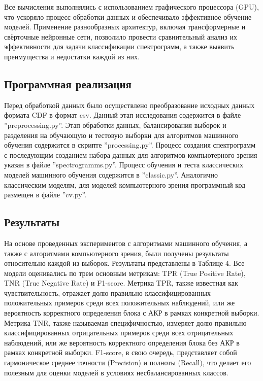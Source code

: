 \documentclass[spec, och, diploma]{SCWorks}
\begin{document}
        Все вычисления выполнялись с использованием графического процессора
        (GPU), что ускоряло процесс обработки данных и обеспечивало эффективное
        обучение моделей. Применение разнообразных архитектур, включая
        трансформерные и свёрточные нейронные сети, позволило провести
        сравнительный анализ их эффективности для задачи классификации
        спектрограмм, а также выявить преимущества и недостатки каждой из них.

    \subsection{Программная реализация}

        Перед обработкой данных было осуществлено преобразование исходных данных
        формата CDF в формат csv. Данный этап исследования содержится в файле
        ''preprocessing.py''. Этап обработки данных, балансирования выборок и
        разделения на обучающую и тестовую выборки для алгоритмов машинного
        обучения содержится в скрипте ''processing.py''. Процесс создания
        спектрограмм с последующим созданием набора данных для алгоритмов
        компьютерного зрения указан в файле ''spectrogramms.py''. Процесс
        обучения и теста классических моделей машинного обучения содержится в
        ''classic.py''. Аналогично классическим моделям, для моделей
        компьютерного зрения программный код размещен в файле ''cv.py''.

    \subsection{Результаты}

        На основе проведенных экспериментов с алгоритмами машинного обучения, а
        также с алгоритмами компьютерного зрения, были получены результаты
        относительно каждой из выборок. Результаты представлены в Таблице 4. Все
        модели оценивались по трем основным метрикам: TPR (True Positive Rate),
        TNR (True Negative Rate) и F1-score. Метрика TPR, также известная как
        чувствительность, отражает долю правильно классифицированных
        положительных примеров среди всех положительных наблюдений, или же
        вероятность корректного определения блока с АКР в рамках конкретной
        выборки. Метрика TNR, также называемая специфичностью, измеряет долю
        правильно классифицированных отрицательных примеров среди всех
        отрицательных наблюдений, или же вероятность корректного определения
        блока без АКР в рамках конкретной выборки. F1-score, в свою очередь,
        представляет собой гармоническое среднее точности (Precision) и полноты
        (Recall), что делает его полезным для оценки моделей в условиях
        несбалансированных классов.
\end{document}
